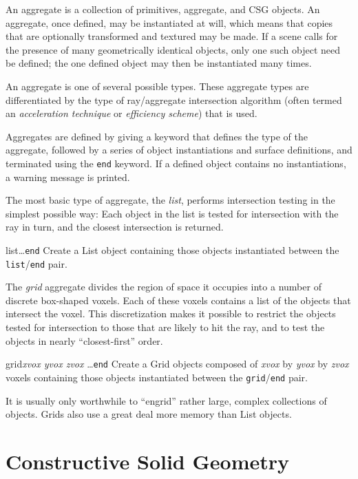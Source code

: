 An aggregate is a collection of primitives, aggregate, and CSG
objects.  An aggregate, once defined, may be instantiated at will,
which means that
copies that are optionally transformed and textured may be made.
If a scene calls for the presence of many geometrically identical
objects, only one such object need be defined; the one defined object
may then be instantiated many times.

An aggregate is one of several possible types.  These aggregate types
are differentiated by the type of ray/aggregate intersection algorithm
(often termed an {\em acceleration technique} or {\em efficiency scheme})
that is used.

Aggregates are defined by giving a keyword that defines the
type of the aggregate, followed by
a series of object instantiations and
surface definitions, and terminated using the {\tt end} keyword.
If a defined object contains no instantiations, a warning message
is printed.

The most basic type of aggregate, the {\em list}, performs
intersection testing in the simplest possible way:  Each object in the
list is tested for intersection with the ray in turn, and the closest
intersection is returned.

\begin{defkey}{list}{\ldots {\tt end}}
	Create a List object containing those objects instantiated between
	the {\tt list}/{\tt end} pair.
\end{defkey}

The {\em grid} aggregate
divides the region of space it occupies into a number of discrete
box-shaped
voxels.  Each of these voxels contains a list of the objects that
intersect the voxel.  This discretization makes it possible to
restrict the objects
tested for intersection to those that are likely to hit the ray,
and to test
the objects in nearly ``closest-first'' order.

\begin{defkey}{grid}{{\em xvox yvox zvox} \ldots {\tt end}}
	Create a Grid objects composed of {\em xvox} by {\em yvox} by
	{\em zvox} voxels containing those objects
	instantiated between the {\tt grid}/{\tt end} pair.
\end{defkey}
It is usually only worthwhile to ``engrid'' rather large,
complex collections of objects.  Grids also use a great deal more
memory than List objects.

\section {Constructive Solid Geometry}

